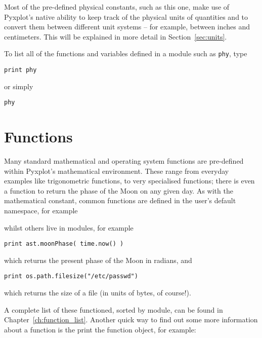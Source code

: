 Most of the pre-defined physical constants, such as this one, make use of
Pyxplot's native ability to keep track of the physical units of quantities and
to convert them between different unit systems -- for example, between inches
and centimeters.  This will be explained in more detail in
Section~\ref{sec:units}.

To list all of the functions and variables defined in a module such as {\tt phy}, type

\begin{verbatim}
print phy
\end{verbatim}

\noindent or simply

\begin{verbatim}
phy
\end{verbatim}


\section{Functions} \label{sec:functions}

Many standard mathematical and operating system functions are pre-defined
within Pyxplot's mathematical environment. These range from everyday examples
like trigonometric functions, to very specialised functions; there is even a
function to return the phase of the Moon on any given day. As with the
mathematical constant, common functions are defined in the user's default
namespace, for example

\vspace{3mm}

\vspace{3mm}

\noindent whilst others live in modules, for example

\begin{verbatim}
print ast.moonPhase( time.now() )
\end{verbatim}

\noindent which returns the present phase of the Moon in radians, and

\begin{verbatim}
print os.path.filesize("/etc/passwd")
\end{verbatim}

\noindent which returns the size of a file (in units of bytes, of course!).

A complete list of these functioned, sorted by module, can be found in
Chapter~\ref{ch:function_list}.  Another quick way to find out some more
information about a function is the print the function object, for example:

